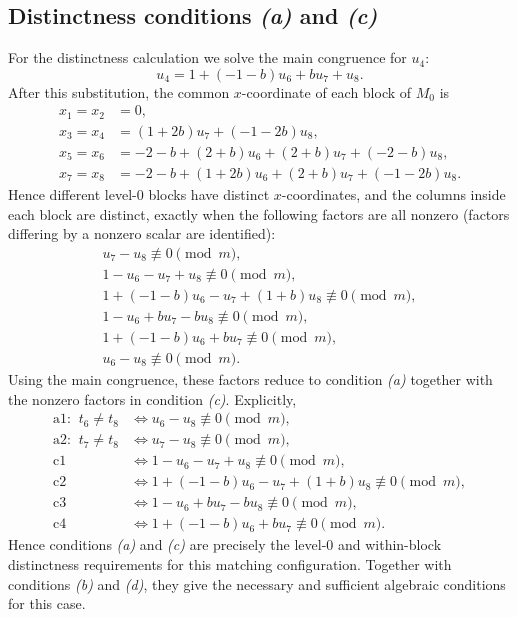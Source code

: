 \documentclass[11pt]{article}
\newcommand{\mymod}{\pmod m}
\begin{document}
\subsection{Distinctness conditions \emph{(a)} and \emph{(c)}}
For the distinctness calculation we solve the main congruence for $u_{4}$:
\[
u_{4}=1 + \left(-1 - b\right)u_{6} + bu_{7} + u_{8}.
\]
After this substitution, the common $x$-coordinate of each block of $M_0$ is
\[
\begin{aligned}
x_{1}=x_{2}&=0,\\
x_{3}=x_{4}&=\left(1 + 2b\right)u_{7} + \left(-1 - 2b\right)u_{8},\\
x_{5}=x_{6}&=-2 - b + \left(2 + b\right)u_{6} + \left(2 + b\right)u_{7} + \left(-2 - b\right)u_{8},\\
x_{7}=x_{8}&=-2 - b + \left(1 + 2b\right)u_{6} + \left(2 + b\right)u_{7} + \left(-1 - 2b\right)u_{8}.
\end{aligned}
\]
Hence different level-$0$ blocks have distinct $x$-coordinates, and the columns inside each block are distinct, exactly when the following factors are all nonzero (factors differing by a nonzero scalar are identified):
\[
\begin{gathered}
u_{7} - u_{8}\not\equiv 0\mymod,\\
1 - u_{6} - u_{7} + u_{8}\not\equiv 0\mymod,\\
1 + \left(-1 - b\right)u_{6} - u_{7} + \left(1 + b\right)u_{8}\not\equiv 0\mymod,\\
1 - u_{6} + bu_{7} - bu_{8}\not\equiv 0\mymod,\\
1 + \left(-1 - b\right)u_{6} + bu_{7}\not\equiv 0\mymod,\\
u_{6} - u_{8}\not\equiv 0\mymod.
\end{gathered}
\]
Using the main congruence, these factors reduce to condition \emph{(a)} together with the nonzero factors in condition \emph{(c)}.  Explicitly,
\[
\begin{aligned}
\text{a1: }\ t_6 \neq t_8&\Longleftrightarrow u_{6} - u_{8}\not\equiv0\mymod,\\
\text{a2: }\ t_7 \neq t_8&\Longleftrightarrow u_{7} - u_{8}\not\equiv0\mymod,\\
\text{c1}&\Longleftrightarrow 1 - u_{6} - u_{7} + u_{8}\not\equiv0\mymod,\\
\text{c2}&\Longleftrightarrow 1 + \left(-1 - b\right)u_{6} - u_{7} + \left(1 + b\right)u_{8}\not\equiv0\mymod,\\
\text{c3}&\Longleftrightarrow 1 - u_{6} + bu_{7} - bu_{8}\not\equiv0\mymod,\\
\text{c4}&\Longleftrightarrow 1 + \left(-1 - b\right)u_{6} + bu_{7}\not\equiv0\mymod.
\end{aligned}
\]
Hence conditions \emph{(a)} and \emph{(c)} are precisely the level-$0$ and within-block distinctness requirements for this matching configuration.  Together with conditions \emph{(b)} and \emph{(d)}, they give the necessary and sufficient algebraic conditions for this case.
\end{document}
